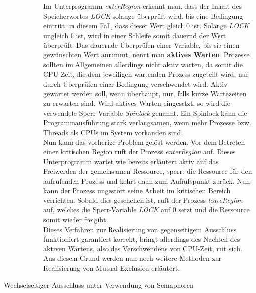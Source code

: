 \begin{description}
\begin{description}
								Im Unterprogramm \textit{enterRegion} erkennt man, dass der Inhalt des Speicherwortes \textit{LOCK} solange überprüft wird, bis eine Bedingung eintritt, in diesem Fall, dass dieser Wert gleich 0 ist. Solange \textit{LOCK} ungleich 0 ist, wird in einer Schleife somit dauernd der Wert überprüft. Das dauernde Überprüfen einer Variable, bis sie einen gewünschten Wert annimmt, nennt man \textbf{aktives Warten}. Prozesse sollten im Allgemeinen allerdings nicht aktiv warten, da somit die CPU-Zeit, die dem jeweiligen wartenden Prozess zugeteilt wird, nur durch Überprüfen einer Bedingung verschwendet wird. Aktiv gewartet werden soll, wenn überhaupt, nur, falls kurze Wartezeiten zu erwarten sind. Wird aktives Warten eingesetzt, so wird die verwendete Sperr-Variable \textit{Spinlock} genannt. Ein Spinlock kann die Programmausführung stark verlangsamen, wenn mehr Prozesse bzw. Threads als CPUs im System vorhanden sind. \cite{ModerneBetriebssysteme} \cite{SpinlockWikipedia}\\
								Nun kann das vorherige Problem gelöst werden. Vor dem Betreten einer kritischen Region ruft der Prozess \textit{enterRegion} auf. Dieses Unterprogramm wartet wie bereits erläutert aktiv auf das Freiwerden der gemeinsamen Ressource, sperrt die Ressource für den aufrufenden Prozess und kehrt dann zum Aufrufspunkt zurück. Nun kann der Prozess ungestört seine Arbeit im kritischen Bereich verrichten. Sobald dies geschehen ist, ruft der Prozess \textit{leaveRegion} auf, welches die Sperr-Variable \textit{LOCK} auf 0 setzt und die Ressource somit wieder freigibt.\\
								Dieses Verfahren zur Realisierung von gegenseitigem Ausschluss funktioniert garantiert korrekt, bringt allerdings des Nachteil des aktiven Wartens, also des Verschwendens von CPU-Zeit, mit sich. Aus diesem Grund werden nun noch weitere Methoden zur Realisierung von Mutual Exclusion erläutert. \cite{ModerneBetriebssysteme}
						\end{description}
				
					\item[Wechselseitiger Ausschluss unter Verwendung von Semaphoren]
					

\end{description}
